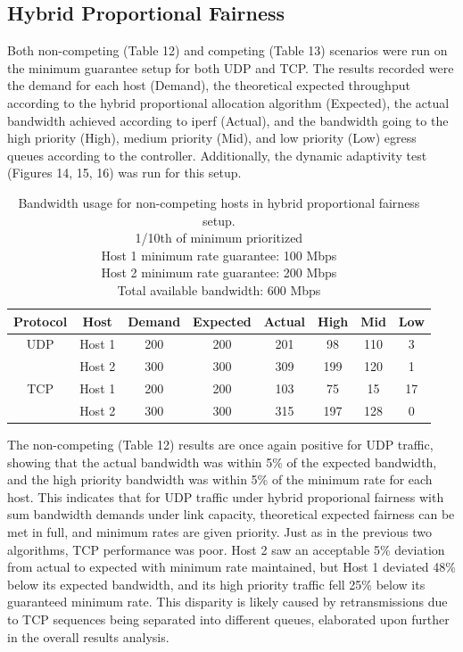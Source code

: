 \documentclass[accepted,single]{gipaper}
\begin{document}
\subsection{Hybrid Proportional Fairness}
\label{dba_hybr}

Both non-competing (Table 12) and competing (Table 13) scenarios were run on the minimum guarantee setup for both UDP and TCP. The results recorded were the demand for each host (Demand), the theoretical expected throughput according to the hybrid proportional allocation algorithm (Expected), the actual bandwidth achieved according to iperf (Actual), and the bandwidth going to the high priority (High), medium priority (Mid), and low priority (Low) egress queues according to the controller. Additionally, the dynamic adaptivity test (Figures 14, 15, 16) was run for this setup.

\begin{table}[h]
	\label{hybr_nc}
	\vspace{-2mm}
	\begin{center}
		\begin{small}
		\setlength\tabcolsep{1.5pt}
			\begin{tabular}{cccccccc}
				Protocol & Host & Demand & Expected & Actual & High & Mid & Low\\
				\hline
				UDP & Host 1 & 200 & 200 & 201 & 98 & 110 & 3\\
				    & Host 2 & 300 & 300 & 309 & 199 & 120 & 1\\
				\hline
				TCP & Host 1 & 200 & 200 & 103 & 75 & 15 & 17\\
				    & Host 2 & 300 & 300 & 315 & 197 & 128 & 0\\
			\end{tabular}
		\end{small}
	\end{center}
	\caption{Bandwidth usage for non-competing hosts in hybrid proportional fairness setup.\\
	1/10th of minimum prioritized\\	
	Host 1 minimum rate guarantee: 100 Mbps\\
	Host 2 minimum rate guarantee: 200 Mbps\\	
	Total available bandwidth: 600 Mbps}
	\vspace{-3mm}
\end{table}

The non-competing (Table 12) results are once again positive for UDP traffic, showing that the actual bandwidth was within 5\% of the expected bandwidth, and the high priority bandwidth was within 5\% of the minimum rate for each host. This indicates that for UDP traffic under hybrid proporional fairness with sum bandwidth demands under link capacity, theoretical expected fairness can be met in full, and minimum rates are given priority. Just as in the previous two algorithms, TCP performance was poor. Host 2 saw an acceptable 5\% deviation from actual to expected with minimum rate maintained, but Host 1 deviated 48\% below its expected bandwidth, and its high priority traffic fell 25\% below its guaranteed minimum rate. This disparity is likely caused by retransmissions due to TCP sequences being separated into different queues, elaborated upon further in the overall results analysis.
\end{document}
